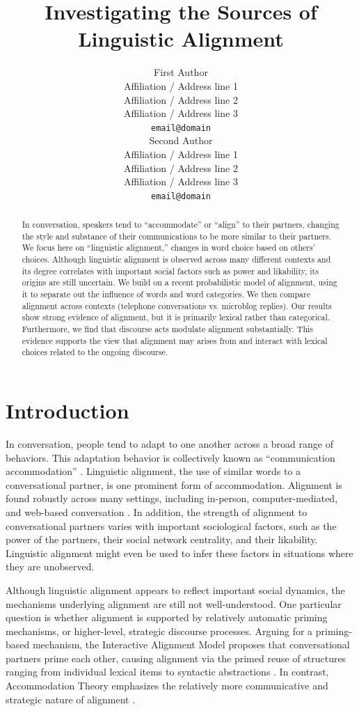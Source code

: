 \documentclass[11pt]{article}
\title{Investigating the Sources of Linguistic Alignment}
\author{First Author \\
  Affiliation / Address line 1 \\
  Affiliation / Address line 2 \\
  Affiliation / Address line 3 \\
  {\tt email@domain} \\\And
  Second Author \\
  Affiliation / Address line 1 \\
  Affiliation / Address line 2 \\
  Affiliation / Address line 3 \\
  {\tt email@domain} \\}
\date{}
\begin{document}
\maketitle

\begin{abstract}
In conversation, speakers tend to ``accommodate'' or ``align'' to their partners, changing the style and substance of their communications to be more similar to their partners. We focus here on ``linguistic alignment,'' changes in word choice based on others' choices. Although linguistic alignment is observed across many different contexts and its degree correlates with important social factors such as power and likability, its origins are still uncertain.
We build on a recent probabilistic model of alignment, using it to separate out the influence of words and word categories. We then compare alignment across contexts (telephone conversations vs. microblog replies).
Our results show strong evidence of alignment, but it is primarily lexical rather than categorical. Furthermore, we find that discourse acts modulate alignment substantially. This evidence supports the view that alignment may arises from and interact with lexical choices related to the ongoing discourse.
\end{abstract}

\section{Introduction}

In conversation, people tend to adapt to one another across a broad range of behaviors. This adaptation behavior is collectively known as ``communication accommodation'' \cite{GilesCouplandCoupland1991}. Linguistic alignment, the use of similar words to a conversational partner, is one prominent form of accommodation. Alignment is found robustly across many settings, including in-person, computer-mediated, and web-based conversation \cite{DNMEtAl2012,GilesSchererTaylor1979,NiederhofferPennebaker2002}. In addition, the strength of alignment to conversational partners varies with important sociological factors, such as the power of the partners, their social network centrality, and their likability. Linguistic alignment might even be used to infer these factors in situations where they are unobserved.

Although linguistic alignment appears to reflect important social dynamics, the mechanisms underlying alignment are still not well-understood. One particular question is whether alignment is supported by relatively automatic priming mechanisms, or higher-level, strategic discourse processes. Arguing for a priming-based mechanism, the Interactive Alignment Model proposes that conversational partners prime each other, causing alignment via the primed reuse of structures ranging from individual lexical items to syntactic abstractions  \cite{PickeringGarrod2004}. In contrast, Accommodation Theory emphasizes the relatively more communicative and strategic nature of alignment \cite{GilesCouplandCoupland1991}.
\end{document}
